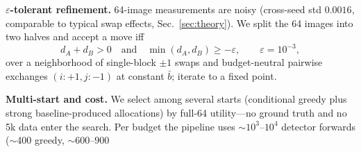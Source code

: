 \smallskip
\noindent\textbf{$\varepsilon$-tolerant refinement.}
64-image measurements are noisy (cross-seed std $0.0016$, comparable to
typical swap effects, Sec.~\ref{sec:theory}). We split the 64 images into
two halves and accept a move iff
\begin{equation}
d_A + d_B > 0
\quad\text{and}\quad
\min(d_A, d_B) \geq -\varepsilon,
\qquad \varepsilon = 10^{-3},
\label{eq:eps}
\end{equation}
over a neighborhood of single-block $\pm1$ swaps and budget-neutral
pairwise exchanges $(i{:}+1, j{:}-1)$ at constant $\bar b$; iterate to a
fixed point.

\smallskip
\noindent\textbf{Multi-start and cost.}
We select among several starts (conditional greedy plus strong
baseline-produced allocations) by full-64 utility---no ground truth and
no 5k data enter the search. Per budget the pipeline uses
  $\sim\!10^3$--$10^4$ detector forwards ($\sim$400 greedy, $\sim$600--$900$
